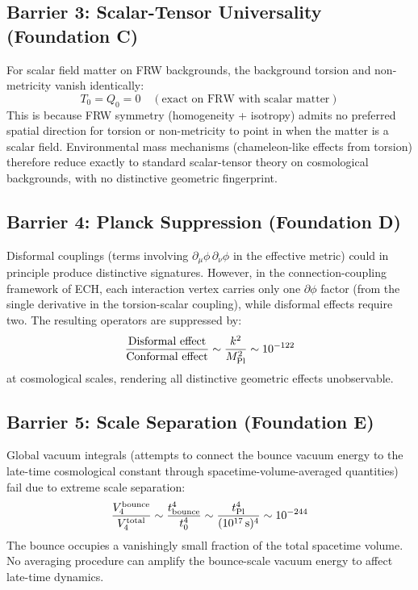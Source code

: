 \documentclass[a4paper,11pt]{article}
\newcommand{\Mpl}{M_{\rm Pl}}
\begin{document}
\subsection{Barrier 3: Scalar-Tensor Universality (Foundation C)}

For scalar field matter on FRW backgrounds, the background torsion and non-metricity vanish identically:
\begin{equation}
T_0 = Q_0 = 0 \quad (\text{exact on FRW with scalar matter})
\end{equation}
This is because FRW symmetry (homogeneity + isotropy) admits no preferred spatial direction for torsion or non-metricity to point in when the matter is a scalar field. Environmental mass mechanisms (chameleon-like effects from torsion) therefore reduce exactly to standard scalar-tensor theory on cosmological backgrounds, with no distinctive geometric fingerprint.

\subsection{Barrier 4: Planck Suppression (Foundation D)}

Disformal couplings (terms involving $\partial_\mu\phi\,\partial_\nu\phi$ in the effective metric) could in principle produce distinctive signatures. However, in the connection-coupling framework of ECH, each interaction vertex carries only one $\partial\phi$ factor (from the single derivative in the torsion-scalar coupling), while disformal effects require two. The resulting operators are suppressed by:
\begin{equation}
\frac{\text{Disformal effect}}{\text{Conformal effect}} \sim \frac{k^2}{\Mpl^2} \sim 10^{-122}
\end{equation}
at cosmological scales, rendering all distinctive geometric effects unobservable.

\subsection{Barrier 5: Scale Separation (Foundation E)}

Global vacuum integrals (attempts to connect the bounce vacuum energy to the late-time cosmological constant through spacetime-volume-averaged quantities) fail due to extreme scale separation:
\begin{equation}
\frac{V_4^{\rm bounce}}{V_4^{\rm total}} \sim \frac{t_{\rm bounce}^4}{t_0^4} \sim \frac{t_{\rm Pl}^4}{(10^{17}\,\text{s})^4} \sim 10^{-244}
\end{equation}
The bounce occupies a vanishingly small fraction of the total spacetime volume. No averaging procedure can amplify the bounce-scale vacuum energy to affect late-time dynamics.
\end{document}
